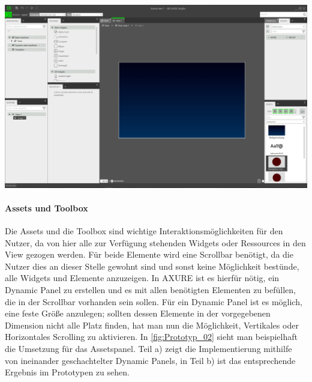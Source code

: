 \begin{center}
  \includegraphics[scale=0.4]{figures/Prototyp_01.PNG}
  \label{fig:Prototyp_01}
\end{center}

\paragraph{Assets und Toolbox}
Die Assets und die Toolbox sind wichtige Interaktionsmöglichkeiten für den Nutzer, da von hier alle zur Verfügung stehenden Widgets oder Ressources in den View gezogen werden.
Für beide Elemente wird eine Scrollbar benötigt, da die Nutzer dies an dieser Stelle gewohnt sind und sonst keine Möglichkeit bestünde, alle Widgets und Elemente anzuzeigen.
In AXURE ist es hierfür nötig, ein Dynamic Panel zu erstellen und es mit allen benötigten Elementen zu befüllen, die in der Scrollbar vorhanden sein sollen.
Für ein Dynamic Panel ist es möglich, eine feste Größe anzulegen; sollten dessen Elemente in der vorgegebenen Dimension nicht alle Platz finden, hat man nun die Möglichkeit, Vertikales oder Horizontales Scrolling zu aktivieren.
In \cref{fig:Prototyp_02} sieht man beispielhaft die Umsetzung für das Assetspanel.
Teil a) zeigt die Implementierung mithilfe von ineinander geschachtelter Dynamic Panels, in Teil b) ist das entsprechende Ergebnis im Prototypen zu sehen.


